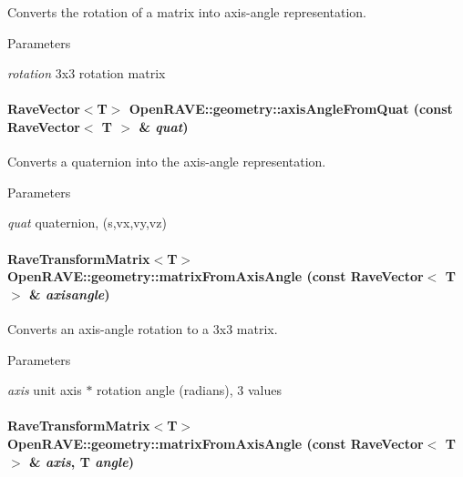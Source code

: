 Converts the rotation of a matrix into axis-\/angle representation. 


\begin{DoxyParams}{Parameters}
\item[{\em rotation}]3x3 rotation matrix \end{DoxyParams}
\hypertarget{group__affine__math_ga95a2de86a8789000c0a12ce91bbefe0c}{
\paragraph[{axisAngleFromQuat}]{\setlength{\rightskip}{0pt plus 5cm}RaveVector$<$T$>$ OpenRAVE::geometry::axisAngleFromQuat (const RaveVector$<$ T $>$ \& {\em quat})}\hfill}
\label{group__affine__math_ga95a2de86a8789000c0a12ce91bbefe0c}


Converts a quaternion into the axis-\/angle representation. 


\begin{DoxyParams}{Parameters}
\item[{\em quat}]quaternion, (s,vx,vy,vz) \end{DoxyParams}
\hypertarget{group__affine__math_ga25cf5562e674415477d2bcd80f95cc5b}{
\paragraph[{matrixFromAxisAngle}]{\setlength{\rightskip}{0pt plus 5cm}RaveTransformMatrix$<$T$>$ OpenRAVE::geometry::matrixFromAxisAngle (const RaveVector$<$ T $>$ \& {\em axisangle})}\hfill}
\label{group__affine__math_ga25cf5562e674415477d2bcd80f95cc5b}


Converts an axis-\/angle rotation to a 3x3 matrix. 


\begin{DoxyParams}{Parameters}
\item[{\em axis}]unit axis $\ast$ rotation angle (radians), 3 values \end{DoxyParams}
\hypertarget{group__affine__math_gad596e9d743a4d08e54db0f01b1657002}{
\paragraph[{matrixFromAxisAngle}]{\setlength{\rightskip}{0pt plus 5cm}RaveTransformMatrix$<$T$>$ OpenRAVE::geometry::matrixFromAxisAngle (const RaveVector$<$ T $>$ \& {\em axis}, \/  T {\em angle})}\hfill}
\label{group__affine__math_gad596e9d743a4d08e54db0f01b1657002}


